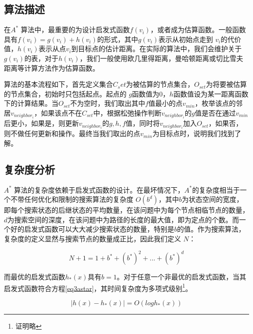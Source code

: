 \documentclass{standalone}
\begin{document}
\subsection{算法描述}
在$A^{*}$ 算法中，最重要的为设计启发式函数$f(v_i)$，或者成为估算函数。一般函数具有$f(v_i) = g(v_i) + h(v_i)$的形式，其中$g(v_i)$表示从初始点走到 $v_i$的代价值，$h(v_i)$表示从点$v_i$到目标点的估计距离。在实际的算法中，我们会维护关于$g(v_i)$的表，对于$h(v_i)$，我们一般使用欧几里得距离，曼哈顿距离或切比雪夫距离等计算方法作为估算函数。\par
算法的基本流程如下，首先定义集合$C_set$为被估算的节点集合，$O_{set}$为将要被估算的节点集合，初始时只包括起点。起点的 $g$函数值为0，$h$函数值设为某一距离函数下的计算结果。当$O_{set}$不为空时，我们取出其中$f$值最小的点$v_{min}$，枚举该点的邻居$v_{neighbor_i}$，如果该点不在$C_{set}$中，根据松弛操作判断$v_{neighbor_i}$的$g$值是否在通过$v_{min}$后更小，如果是，则更新$v_{neighbor_i}$的$g, h, f$值，同时将$v_{neighbor_i}$加入$O_{set}$，如果否，则不做任何更新和操作。最终当我们取出的点$v_{min}$为目标点时，说明我们找到了解。
\subsection{复杂度分析}
$A^{*}$ 算法的复杂度依赖于启发式函数的设计。在最坏情况下，$A^{*}$的复杂度相当于一个不带任何优化和限制的搜索算法的复杂度 $O(b^d)$，其中$b$为状态空间的宽度，即每个搜索状态的后继状态的平均数量，在该问题中为每个节点相临节点的数量，$d$为搜索空间的深度，在该问题中为路径的长度的最大值，即为定点的个数。而一个好的启发式函数可以大大减少搜索状态的数量，特别是$b$的值。作为搜索算法，复杂度的定义显然与搜索节点的数量成正比，因此我们定义 $N$： 
\begin{center}
    \begin{equation}
        N + 1 = 1 + b^* + (b^*)^2 + ... + (b^*)^d
    \end{equation}
\end{center}
而最优的启发式函数$h_*(x)$具有$b=1$。对于任意一个非最优的启发式函数，当其启发式函数符合方程\ref{eq3astar}，其时间复杂度为多项式级别\footnote{证明略}。
\begin{center}
    \begin{equation}
    \label{eq3astar}
        |h(x) - h_*(x)| = O(logh_*(x))
    \end{equation}
    
\end{center}
\end{document}
